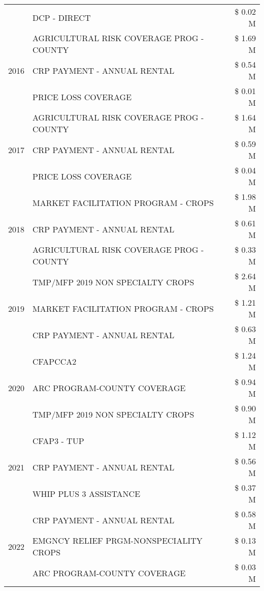\begin{tabular}{llr}
 & DCP - DIRECT & \$ 0.02 M \\
\cline{1-3}
\multirow[t]{3}{*}{2016} & AGRICULTURAL RISK COVERAGE PROG - COUNTY & \$ 1.69 M \\
 & CRP PAYMENT - ANNUAL RENTAL & \$ 0.54 M \\
 & PRICE LOSS COVERAGE & \$ 0.01 M \\
\cline{1-3}
\multirow[t]{3}{*}{2017} & AGRICULTURAL RISK COVERAGE PROG - COUNTY & \$ 1.64 M \\
 & CRP PAYMENT - ANNUAL RENTAL & \$ 0.59 M \\
 & PRICE LOSS COVERAGE & \$ 0.04 M \\
\cline{1-3}
\multirow[t]{3}{*}{2018} & MARKET FACILITATION PROGRAM - CROPS & \$ 1.98 M \\
 & CRP PAYMENT - ANNUAL RENTAL & \$ 0.61 M \\
 & AGRICULTURAL RISK COVERAGE PROG - COUNTY & \$ 0.33 M \\
\cline{1-3}
\multirow[t]{3}{*}{2019} & TMP/MFP 2019 NON SPECIALTY CROPS & \$ 2.64 M \\
 & MARKET FACILITATION PROGRAM - CROPS & \$ 1.21 M \\
 & CRP PAYMENT - ANNUAL RENTAL & \$ 0.63 M \\
\cline{1-3}
\multirow[t]{3}{*}{2020} & CFAPCCA2 & \$ 1.24 M \\
 & ARC PROGRAM-COUNTY COVERAGE & \$ 0.94 M \\
 & TMP/MFP 2019 NON SPECIALTY CROPS & \$ 0.90 M \\
\cline{1-3}
\multirow[t]{3}{*}{2021} & CFAP3 - TUP & \$ 1.12 M \\
 & CRP PAYMENT - ANNUAL RENTAL & \$ 0.56 M \\
 & WHIP PLUS 3 ASSISTANCE & \$ 0.37 M \\
\cline{1-3}
\multirow[t]{3}{*}{2022} & CRP PAYMENT - ANNUAL RENTAL & \$ 0.58 M \\
 & EMGNCY RELIEF PRGM-NONSPECIALITY CROPS & \$ 0.13 M \\
 & ARC PROGRAM-COUNTY COVERAGE & \$ 0.03 M \\
\cline{1-3}
\bottomrule
\end{tabular}
